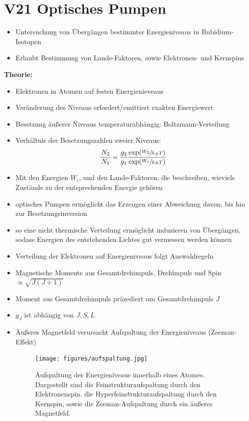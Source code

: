 \section{V21 Optisches Pumpen}
\label{sec:V21}

\begin{itemize}
    \item Untersuchung von Übergängen bestimmter Energieniveaus in Rubidium-Isotopen
    \item Erlaubt Bestimmung von Lande-Faktoren, sowie Elektronen- und Kernspins
\end{itemize}

\textbf{Theorie:}
\begin{itemize}
    \item Elektronen in Atomen auf festen Energienieveaus
    \item Veränderung des Niveaus erfordert/emittiert exakten Energiewert
    \item Besetzung äußerer Niveaus temperaturabhängig: Boltzmann-Verteilung
    \item Verhältnis der Besetzungszahlen zweier Niveaus:
        \begin{equation}
            \frac{N_2}{N_1}=\frac{g_2}{g_1}\frac{\exp(\sfrac{W_2}{k_BT})}{\exp(\sfrac{W_1}{k_BT})}
        \end{equation}
    \item Mit den Energien $W_i$, und den Lande-Faktoren, die beschreiben, wieviele Zustände zu der entsprechenden Energie gehören
    \item optisches Pumpen ermöglicht das Erzeugen einer Abweichung davon, bis hin zur Besetzungsinversion
    \item so eine nicht thermische Verteilung ermöglicht induzieren von Übergängen, sodass Energien des entstehenden Lichtes gut vermessen werden können
    \item Verteilung der Elektronen auf Energieniveaus folgt Auswahlregeln
    \item Magnetische Momente aus Gesamtdrehimpuls, Drehimpuls und Spin $\propto \sqrt{J(J+1)}$
    \item Moment aus Gesamtdrehimpuls präzediert um Gesamtdrehimpuls $J$
    \item $g_J$ ist abhängig von $J,S,L$
    \item Äußeres Magnetfeld verursacht Aufspaltung der Energieniveaus (Zeeman-Effekt)
       \begin{figure}[H]
          \centering
          \texttt{[image: figures/aufspaltung.jpg]}
          \caption{Aufspaltung der Energieniveaus innerhalb eines Atomes. Dargestellt
                    sind die Feinstrukturaufspaltung durch den Elektronenspin, die
                    Hyperfeinstrukturaufspaltung durch den Kernspin, sowie die Zeeman-Aufspaltung
                    durch ein äußeres Magnetfeld.}
        \end{figure}
\end{itemize}

